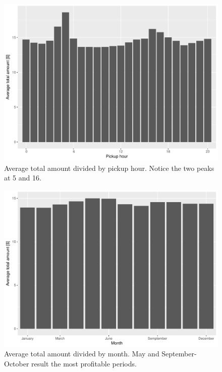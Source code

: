 \documentclass{acm_proc_article-sp-sigmod09}
\begin{document}
\begin{figure}
	\centering
	\includegraphics[width=1\columnwidth]{resources/base_plots/avg_total_amount_by_pickup_hour.pdf}
	\caption{Average total amount divided by pickup hour. Notice the two peaks at 5 and 16.}
	\label{fig:totalAmountByHour}
\end{figure}

\begin{figure}
	\centering
	\includegraphics[width=1\columnwidth]{resources/base_plots/avg_total_amount_by_month.pdf}
	\caption{Average total amount divided by month. May and September-October result the most profitable periods.}
	\label{fig:totalAmountByMonth}
\end{figure}
\end{document}
